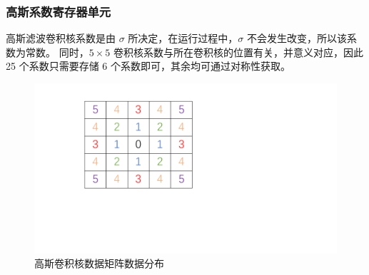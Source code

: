 \documentclass[12pt, a4paper, oneside]{ctexbook}
\begin{document}
	\subsubsection{高斯系数寄存器单元}
	高斯滤波卷积核系数是由 $\sigma$ 所决定，在运行过程中，$\sigma$ 不会发生改变，所以该系数为常数。
	同时，$5\times5$ 卷积核系数与所在卷积核的位置有关，并意义对应，因此25 个系数只需要存储 6 个系数即可，其余均可通过对称性获取。
	\begin{figure}[h]
		\centering
		\includegraphics[scale=0.4]{pic/number}
		\caption{高斯卷积核数据矩阵数据分布}
		\label{fig:number}
	\end{figure}
\end{document}

